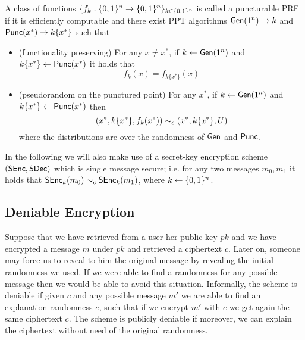 \begin{mydef}
A class of functions $\{f_k:\{0,1\}^n\to\{0,1\}^n\}_{k\in\{0,1\}^n}$ is called a puncturable PRF if it is efficiently computable and there exist PPT algorithms $\mathsf{Gen}(1^n)\to k$ and $\mathsf{Punc}(x^*)\to k\{x^*\}$ such that
\begin{itemize}
\item (functionality preserving) For any $x\ne x^*$, if $k\gets\mathsf{Gen}(1^n)$ and $k\{x^*\}\gets\mathsf{Punc}(x^*)$ it holds that
\[
f_k(x)=f_{k\{x^*\}}(x)
\]
\item (pseudorandom on the punctured point) For any $x^*$, if $k\gets\mathsf{Gen}(1^n)$ and $k\{x^*\}\gets\mathsf{Punc}(x^*)$ then
\[
\left(x^*,k\{x^*\},f_k(x^*)\right)\sim_c \left(x^*,k\{x^*\},U\right)
\]
where the distributions are over the randomness of $\mathsf{Gen}$ and $\mathsf{Punc}$.
\end{itemize}
\end{mydef}

In the following we will also make use of a secret-key encryption scheme $(\mathsf{SEnc},\mathsf{SDec})$ which is single message secure; i.e. for any two messages $m_0,m_1$ it holds that $\mathsf{SEnc}_k(m_0)\sim_c\mathsf{SEnc}_k(m_1)$, where $k\gets\{0,1\}^n$.


\subsection{Deniable Encryption}
Suppose that we have retrieved from a user her public key $pk$ and we have encrypted a message $m$ under $pk$ and retrieved a ciphertext $c$. Later on, someone may force us to reveal to him the original message by revealing the initial randomness we used. If we were able to find a randomness for any possible message then we would be able to avoid this situation. Informally, the scheme is deniable if given $c$ and any possible message $m'$ we are able to find an explanation randomness $e$, such that if we encrypt $m'$ with $e$ we get again the same ciphertext $c$. The scheme is publicly deniable if moreover, we can explain the ciphertext without need of the original randomness.

